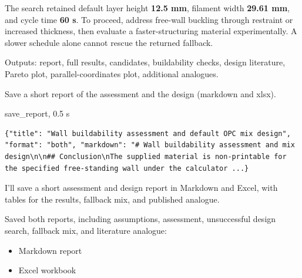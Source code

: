\begin{agentbox}
\par
The search retained default layer height \textbf{12.5 mm}, filament width \textbf{29.61 mm}, and cycle time \textbf{60 s}. To proceed, address free-wall buckling through restraint or increased thickness, then evaluate a faster-structuring material experimentally. A slower schedule alone cannot rescue the returned fallback.\par
\par
Outputs: report, full results, candidates, buildability checks, design literature, Pareto plot, parallel-coordinates plot, additional analogues.\par
\par
\end{agentbox}
\begin{userbox}
Save a short report of the assessment and the design (markdown and xlsx).
\end{userbox}
\begin{toolbox}{save\_report, 0.5 s}
\begin{lstlisting}[style=argstyle]
{"title": "Wall buildability assessment and default OPC mix design", "format": "both", "markdown": "# Wall buildability assessment and mix design\n\n## Conclusion\nThe supplied material is non-printable for the specified free-standing wall under the calculator ...}
\end{lstlisting}
\end{toolbox}
\begin{agentbox}
I'll save a short assessment and design report in Markdown and Excel, with tables for the results, fallback mix, and published analogue.\par
Saved both reports, including assumptions, assessment, unsuccessful design search, fallback mix, and literature analogue:\par
\par
\begin{itemize}[nosep,leftmargin=1.2em]
\item Markdown report
\item Excel workbook
\end{itemize}
\end{agentbox}